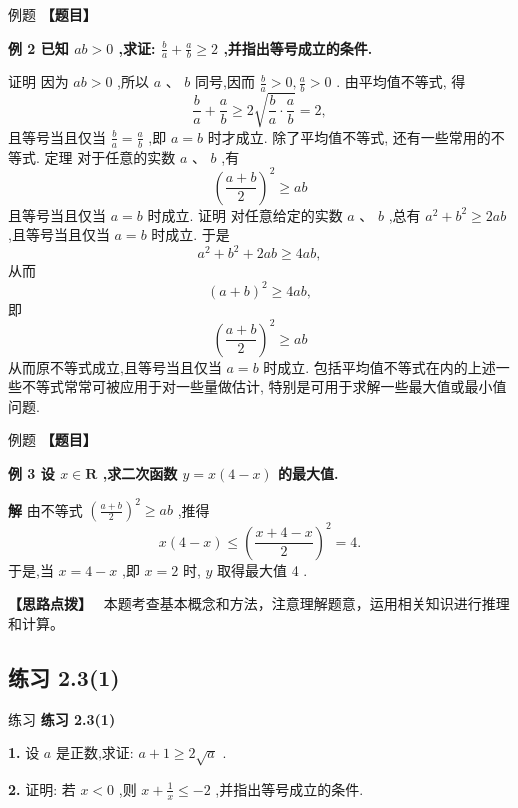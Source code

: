 \documentclass[a4paper,10pt,oneside,fontset=none]{ctexbook}
\renewcommand{\geq}{\geqslant}
\renewcommand{\leq}{\leqslant}
\newcounter{example}[chapter]
\newenvironment{example}[1][]{\begin{exBox}{例题}{#1}}{\end{exBox}}
\newenvironment{exercise}[1][]{\begin{exBox}{练习}{#1}}{\end{exBox}}
\numberwithin{equation}{chapter}
\newenvironment{solution}{\begin{solutionBox}}{\end{solutionBox}}
\newenvironment{hint}{\begin{hintBox}\textbf{【思路点拨】}~}{\end{hintBox}}
\begin{document}
\begin{example}
\textbf{【题目】}\par\vspace{0.3em}
\textbf{例 2 已知 ${ab} > 0$ ,求证: $\frac{b}{a} + \frac{a}{b} \geq  2$ ,并指出等号成立的条件.}\par\vspace{0.3em}
证明 因为 ${ab} > 0$ ,所以 $a\text{ 、 }b$ 同号,因而 $\frac{b}{a} > 0,\frac{a}{b} > 0$ .
由平均值不等式, 得
$$
\frac{b}{a} + \frac{a}{b} \geq  2\sqrt{\frac{b}{a} \cdot  \frac{a}{b}} = 2,
$$
且等号当且仅当 $\frac{b}{a} = \frac{a}{b}$ ,即 $a = b$ 时才成立.
除了平均值不等式, 还有一些常用的不等式.
定理 对于任意的实数 $a\text{ 、 }b$ ,有
$$
{\left( \frac{a + b}{2}\right) }^{2} \geq  {ab}
$$
且等号当且仅当 $a = b$ 时成立.
证明 对任意给定的实数 $a\text{ 、 }b$ ,总有 ${a}^{2} + {b}^{2} \geq  {2ab}$ ,且等号当且仅当 $a = b$ 时成立. 于是
$$
{a}^{2} + {b}^{2} + {2ab} \geq  {4ab},
$$
从而
$$
{\left( a + b\right) }^{2} \geq  {4ab},
$$
即
$$
{\left( \frac{a + b}{2}\right) }^{2} \geq  {ab}
$$
从而原不等式成立,且等号当且仅当 $a = b$ 时成立.
包括平均值不等式在内的上述一些不等式常常可被应用于对一些量做估计, 特别是可用于求解一些最大值或最小值问题.
\end{example}

\begin{example}
\textbf{【题目】}\par\vspace{0.3em}
\textbf{例 3 设 $x \in  \mathbf{R}$ ,求二次函数 $y = x\left( {4 - x}\right)$ 的最大值.}\par\vspace{0.3em}
\end{example}

\begin{solution}
\textbf{解}
由不等式 ${\left( \frac{a + b}{2}\right) }^{2} \geq  {ab}$ ,推得
$$
x\left( {4 - x}\right)  \leq  {\left( \frac{x + 4 - x}{2}\right) }^{2} = 4.
$$
于是,当 $x = 4 - x$ ,即 $x = 2$ 时, $y$ 取得最大值 4 .
\end{solution}

\begin{hint}
本题考查基本概念和方法，注意理解题意，运用相关知识进行推理和计算。
\end{hint}

\subsection*{练习 2.3(1)}

\begin{exercise}
\textbf{练习 2.3(1)}\par\vspace{0.5em}
\textbf{1.} 设 $a$ 是正数,求证: $a + 1 \geq  2\sqrt{a}$ .
\par\vspace{0.8em}
\textbf{2.} 证明: 若 $x < 0$ ,则 $x + \frac{1}{x} \leq   - 2$ ,并指出等号成立的条件.
\end{exercise}
\end{document}
